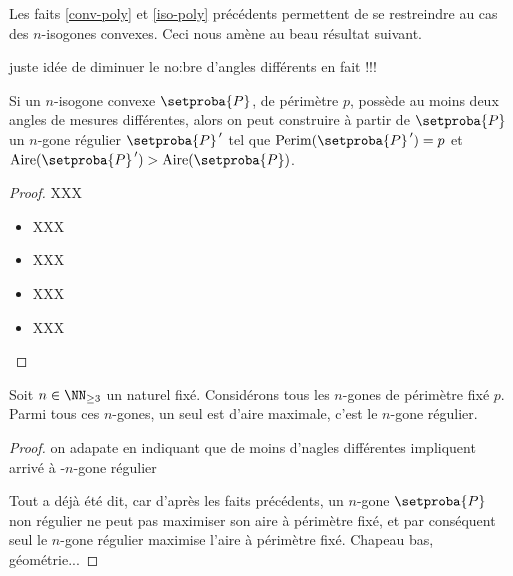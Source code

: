 

Les faits \ref{conv-poly} et \ref{iso-poly} précédents permettent de se restreindre au cas des $n$-isogones convexes. Ceci nous amène au beau résultat suivant.

\begin{fact} \label{reg-poly}
	juste idée de diminuer le no:bre d'angles différents en fait !!!
	
	
	Si un $n$-isogone convexe $\setproba{P}$, de périmètre $p$, possède au moins deux angles de mesures différentes, alors on peut construire à partir de $\setproba{P}$ un $n$-gone régulier $\setproba{P}^{\,\prime}$ tel que $\perim{\setproba{P}^{\,\prime}} = p$ et $\area{\setproba{P}^{\,\prime}} > \area{\setproba{P}}$.
\end{fact}


\begin{proof}
		XXX
	\begin{itemize}
		\item XXX

		\item XXX

		\item XXX

		\item XXX
	\end{itemize}
\end{proof}




\begin{fact}
	Soit $n \in \NN_{\geq3}$ un naturel fixé.
	Considérons tous les $n$-gones de périmètre fixé $p$. Parmi tous ces $n$-gones, un seul est d'aire maximale, c'est le $n$-gone régulier.
\end{fact}


\begin{proof}
	on adapate en indiquant que de moins d'nagles différentes impliquent arrivé à -$n$-gone régulier
	
	Tout a déjà été dit, car d'après les faits précédents, un $n$-gone $\setproba{P}$ non régulier ne peut pas maximiser son aire à périmètre fixé, et par conséquent seul le $n$-gone régulier maximise l'aire à périmètre fixé. Chapeau bas, géométrie...
\end{proof}
